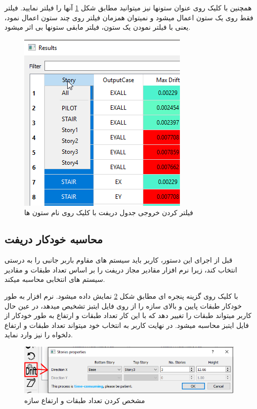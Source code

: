 همچنین با کلیک روی عنوان ستونها نیز میتوانید مطابق شکل 
\ref{pic:drift_filter}
 آنها را فیلتر نمایید. فیلتر فقط روی یک ستون اعمال میشود و نمیتوان همزمان فیلتر روی چند ستون اعمال نمود، یعنی با فیلتر نمودن یک ستون، فیلتر مابقی ستونها بی اثر میشود.
 
 
\begin{figure}[H]
    \centering
    \includegraphics[scale=0.7]{figures/drift_filter}
    \caption{فیلتر کردن خروجی جدول دریفت با کلیک روی نام ستون ها}
    \label{pic:drift_filter}
\end{figure}


\subsection{محاسبه خودکار دریفت}
قبل از اجرای این دستور، کاربر باید سیستم های مقاوم باربر جانبی را به درستی انتخاب کند، زیرا نرم افزار مقادیر مجاز دریفت را بر اساس تعداد طبقات و مقادیر 
سیستم های انتخابی محاسبه میکند.

با کلیک روی گزینه 
پنجره ای مطابق شکل \ref{pic:top_bot_story} نمایش داده میشود.
نرم افزار به طور خودکار طبقات پایین و بالای سازه را از روی فایل ایتبز تشخیص میدهد، در عین حال کاربر میتواند طبقات را تغییر دهد که با این کار تعداد طبقات و ارتفاع به طور خودکار از فایل ایتبز محاسبه میشود.
در نهایت کاربر به انتخاب خود میتواند تعداد طبقات و ارتفاع دلخواه را نیز وارد نماید.

\begin{figure}[H]
    \centering
    \includegraphics[scale=0.7]{figures/top_bot_story}
    \caption{مشخص کردن تعداد طبقات و ارتفاع سازه}
    \label{pic:top_bot_story}
\end{figure}

